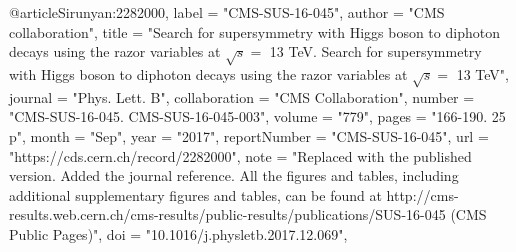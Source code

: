 @article{Sirunyan:2282000,
      label          = "CMS-SUS-16-045",
      author        = "{CMS collaboration}",
      title         = "{Search for supersymmetry with Higgs boson to diphoton
                       decays using the razor variables at $\sqrt{s} = $ 13 TeV.
                       Search for supersymmetry with Higgs boson to diphoton
                       decays using the razor variables at $\sqrt{s}=$ 13 TeV}",
      journal       = "Phys. Lett. B",
      collaboration = "CMS Collaboration",
      number        = "CMS-SUS-16-045. CMS-SUS-16-045-003",
      volume        = "779",
      pages         = "166-190. 25 p",
      month         = "Sep",
      year          = "2017",
      reportNumber  = "CMS-SUS-16-045",
      url           = "https://cds.cern.ch/record/2282000",
      note          = "Replaced with the published version. Added the journal
                       reference. All the figures and tables, including additional
                       supplementary figures and tables, can be found at
                       http://cms-results.web.cern.ch/cms-results/public-results/publications/SUS-16-045
                       (CMS Public Pages)",
      doi           = "10.1016/j.physletb.2017.12.069",
}

